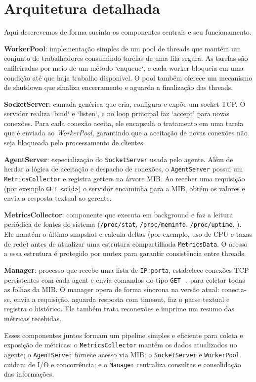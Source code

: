\documentclass[12pt,a4paper]{article}
\begin{document}
\section{Arquitetura detalhada}
Aqui descrevemos de forma sucinta os componentes centrais e seu funcionamento.

\textbf{WorkerPool}: implementação simples de um pool de threads que mantém um conjunto de trabalhadores consumindo tarefas de uma fila segura. As tarefas são enfileiradas por meio de um método `enqueue`, e cada worker bloqueia em uma condição até que haja trabalho disponível. O pool também oferece um mecanismo de shutdown que sinaliza encerramento e aguarda a finalização das threads.

\textbf{SocketServer}: camada genérica que cria, configura e expõe um socket TCP. O servidor realiza `bind` e `listen`, e no loop principal faz `accept` para novas conexões. Para cada conexão aceita, ele encapsula o tratamento em uma tarefa que é enviada ao \textit{WorkerPool}, garantindo que a aceitação de novas conexões não seja bloqueada pelo processamento de clientes.

\textbf{AgentServer}: especialização do \texttt{SocketServer} usada pelo agente. Além de herdar a lógica de aceitação e despacho de conexões, o \texttt{AgentServer} possui um \texttt{MetricsCollector} e registra getters na árvore MIB. Ao receber uma requisição (por exemplo \texttt{GET <oid>}) o servidor encaminha para a MIB, obtém os valores e envia a resposta textual ao gerente.

\textbf{MetricsCollector}: componente que executa em background e faz a leitura periódica de fontes do sistema (\texttt{/proc/stat}, \texttt{/proc/meminfo}, \texttt{/proc/uptime}, ). Ele mantém o último snapshot e calcula deltas (por exemplo, uso de CPU e taxas de rede) antes de atualizar uma estrutura compartilhada \texttt{MetricsData}. O acesso a essa estrutura é protegido por mutex para garantir consistência entre threads.

\textbf{Manager}: processo que recebe uma lista de \texttt{IP:porta}, estabelece conexões TCP persistentes com cada agent e envia comandos do tipo \texttt{GET .} para coletar todas as folhas da MIB. O manager opera de forma síncrona na versão atual: conecta-se, envia a requisição, aguarda resposta com timeout, faz o parse textual e registra o histórico. Ele também trata reconexões e imprime um resumo das métricas recebidas.

Esses componentes juntos formam um pipeline simples e eficiente para coleta e exposição de métricas: o \texttt{MetricsCollector} mantém os dados atualizados no agente; o \texttt{AgentServer} fornece acesso via MIB; o \texttt{SocketServer} e \texttt{WorkerPool} cuidam de I/O e concorrência; e o \texttt{Manager} centraliza consultas e consolidação das informações.
\end{document}
